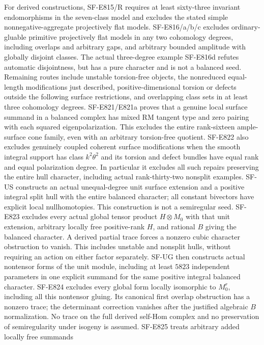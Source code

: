 \documentclass[11pt]{article}
\theoremstyle{remark}\newtheorem{remark}[theorem]{Remark}
\begin{document}
For derived constructions, SF-E815/R requires at least sixty-three
invariant endomorphisms in the seven-class model and excludes the
stated simple nonnegative-aggregate projectively flat models.
SF-E816/a/b/c excludes ordinary-gluable primitive projectively flat
models in any two cohomology degrees, including overlaps and arbitrary
gaps, and arbitrary bounded amplitude with globally disjoint classes.
The actual three-degree example SF-E816d refutes automatic disjointness,
but has a pure character and is not a balanced seed. Remaining routes
include unstable torsion-free objects, the nonreduced equal-length
modifications just described,
positive-dimensional torsion or defects outside the following surface
restrictions, and overlapping class sets in at least three cohomology
degrees. SF-E821/E821a proves that a genuine local surface summand in
a balanced complex has mixed RM tangent type and zero pairing with
each squared eigenpolarization. This excludes the entire rank-sixteen
ample-surface cone family, even with an arbitrary torsion-free
quotient. SF-E822 also excludes genuinely coupled coherent surface
modifications when the smooth integral support has class
$k^2\theta^2$ and its torsion and defect bundles have equal rank and
equal polarization degree. In particular it excludes all such repairs
preserving the entire hull character, including actual rank-thirty-two
nonsplit examples. SF-US constructs an actual unequal-degree unit
surface extension and a positive integral split hull with the entire
balanced character; all constant bivectors have explicit local
nullhomotopies. This construction is not a semiregular seed.
SF-E823 excludes every actual global tensor product $H\otimes M_0$
with that unit extension, arbitrary locally free positive-rank $H$,
and rational $B$ giving the balanced character. A derived partial trace
forces a nonzero cubic character obstruction to vanish. This includes
unstable and nonsplit hulls, without requiring an action on either
factor separately. SF-UG then constructs actual nontensor forms of
the unit module, including at least $5823$ independent parameters in
one explicit summand for the same positive integral balanced character.
SF-E824 excludes every global form locally isomorphic to $M_0^r$,
including all this nontensor gluing. Its canonical first overlap
obstruction has a nonzero trace; the determinant correction vanishes
after the justified algebraic $B$ normalization. No trace on the full
derived self-Hom complex and no preservation of semiregularity under
isogeny is assumed. SF-E825 treats arbitrary added locally free summands
\end{document}
